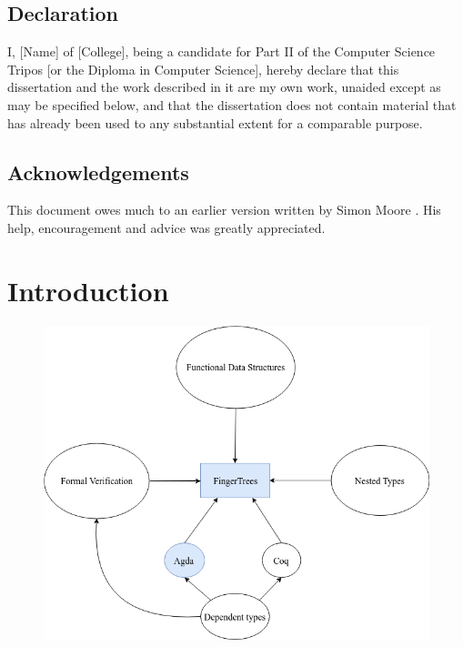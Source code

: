 \documentclass[12pt,twoside,notitlepage]{report}
\begin{document}
\newpage
\section*{Declaration}

I, [Name] of [College], being a candidate for Part II of the Computer
Science Tripos [or the Diploma in Computer Science], hereby declare
that this dissertation and the work described in it are my own work,
unaided except as may be specified below, and that the dissertation
does not contain material that has already been used to any substantial
extent for a comparable purpose.

\bigskip
{}

\medskip
{}

\cleardoublepage

\tableofcontents

\listoffigures

\newpage
\section*{Acknowledgements}

This document owes much to an earlier version written by Simon Moore
\cite{moore95}.  His help, encouragement and advice was greatly
appreciated.


\cleardoublepage        %

\setcounter{page}{1}
\pagestyle{headings}


\chapter{Introduction}

\begin{figure}
\centering 

\includegraphics[scale=0.6]{flow}
\end{figure}
\end{document}
